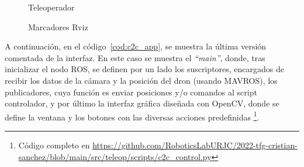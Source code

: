 \begin{figure} [h]
	\centering
	\quad
	\caption{Teleoperador}
	\caption{Marcadores Rviz}
	\label{fig:teleop_figs}
\end{figure}

A continuación, en el código~\ref{cod:c2c_app}, se muestra la última versión comentada de la interfaz. En este caso se muestra el \emph{``main''}, donde, tras inicializar el nodo \ac{ROS}, se definen por un lado los suscriptores, encargados de recibir los datos de la cámara y la posición del dron (usando MAVROS), los publicadores, cuya función es enviar posiciones y/o comandos al script controlador, y por último la interfaz gráfica diseñada con OpenCV, donde se define la ventana y los botones con las diversas acciones predefinidas \footnote{Código completo en \url{https://github.com/RoboticsLabURJC/2022-tfg-cristian-sanchez/blob/main/src/teleop/scripts/c2c_control.py}}.\\

